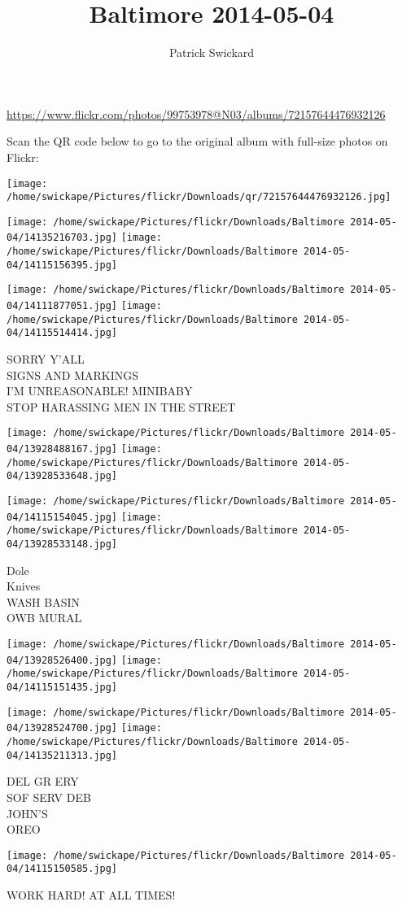 \documentclass[10pt,letterpaper]{article}
\title{Baltimore 2014-05-04}
\author{Patrick Swickard}
\date{}
\begin{document}
\maketitle

\url{https://www.flickr.com/photos/99753978@N03/albums/72157644476932126}

Scan the QR code below to go to the original album with full-size photos on Flickr:

\texttt{[image: /home/swickape/Pictures/flickr/Downloads/qr/72157644476932126.jpg]}
\pagebreak

\texttt{[image: /home/swickape/Pictures/flickr/Downloads/Baltimore 2014-05-04/14135216703.jpg]}
\texttt{[image: /home/swickape/Pictures/flickr/Downloads/Baltimore 2014-05-04/14115156395.jpg]}

\texttt{[image: /home/swickape/Pictures/flickr/Downloads/Baltimore 2014-05-04/14111877051.jpg]}
\texttt{[image: /home/swickape/Pictures/flickr/Downloads/Baltimore 2014-05-04/14115514414.jpg]}

SORRY Y'ALL\\
SIGNS AND MARKINGS\\
I'M UNREASONABLE! MINIBABY\\
STOP HARASSING MEN IN THE STREET
\pagebreak

\texttt{[image: /home/swickape/Pictures/flickr/Downloads/Baltimore 2014-05-04/13928488167.jpg]}
\texttt{[image: /home/swickape/Pictures/flickr/Downloads/Baltimore 2014-05-04/13928533648.jpg]}

\texttt{[image: /home/swickape/Pictures/flickr/Downloads/Baltimore 2014-05-04/14115154045.jpg]}
\texttt{[image: /home/swickape/Pictures/flickr/Downloads/Baltimore 2014-05-04/13928533148.jpg]}

Dole\\
Knives\\
WASH BASIN\\
OWB MURAL
\pagebreak

\texttt{[image: /home/swickape/Pictures/flickr/Downloads/Baltimore 2014-05-04/13928526400.jpg]}
\texttt{[image: /home/swickape/Pictures/flickr/Downloads/Baltimore 2014-05-04/14115151435.jpg]}

\texttt{[image: /home/swickape/Pictures/flickr/Downloads/Baltimore 2014-05-04/13928524700.jpg]}
\texttt{[image: /home/swickape/Pictures/flickr/Downloads/Baltimore 2014-05-04/14135211313.jpg]}

DEL GR ERY\\
SOF SERV DEB\\
JOHN'S\\
OREO
\pagebreak

\texttt{[image: /home/swickape/Pictures/flickr/Downloads/Baltimore 2014-05-04/14115150585.jpg]}

WORK HARD!  AT ALL TIMES!
\pagebreak
\end{document}

